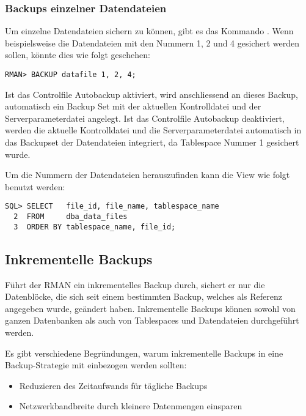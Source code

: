         \subsubsection{Backups einzelner Datendateien}
          Um einzelne Datendateien sichern zu k\"onnen, gibt es das Kommando . Wenn beispielsweise die Datendateien mit den Nummern 1, 2 und 4 gesichert werden sollen, k\"onnte dies wie folgt geschehen:
          \begin{lstlisting}[caption={Backup einzelner Datendateien},label=admin1311,language=rman]
RMAN> BACKUP datafile 1, 2, 4;
          \end{lstlisting}
          \begin{merke}
            Ist das Controlfile Autobackup aktiviert, wird anschliessend an dieses Backup, automatisch ein Backup Set mit der aktuellen Kontrolldatei und der Serverparameterdatei angelegt. Ist das Controlfile Autobackup deaktiviert, werden die aktuelle Kontrolldatei und die Serverparameterdatei automatisch in das Backupset der Datendateien integriert, da Tablespace Nummer 1 gesichert wurde.
          \end{merke}
          Um die Nummern der Datendateien herauszufinden kann die View  wie folgt benutzt werden:
          \begin{lstlisting}[caption={Herausfinden der Datendateinummern},label=admin1312,language=oracle_sql]
SQL> SELECT   file_id, file_name, tablespace_name
  2  FROM     dba_data_files
  3  ORDER BY tablespace_name, file_id;
          \end{lstlisting}
      \subsection{Inkrementelle Backups}
        F\"uhrt der RMAN ein inkrementelles Backup durch, sichert er nur die Datenbl\"ocke, die sich seit einem bestimmten Backup, welches als Referenz angegeben wurde, ge\"andert haben. Inkrementelle Backups k\"onnen sowohl von ganzen Datenbanken als auch von Tablespaces und Datendateien durchgef\"uhrt werden.

        Es gibt verschiedene Begr\"undungen, warum inkrementelle Backups in eine Backup-Stra\-te\-gie mit einbezogen werden sollten:
        \begin{itemize}
          \item Reduzieren des Zeitaufwands f\"ur t\"agliche Backups
          \item Netzwerkbandbreite durch kleinere Datenmengen einsparen
        \end{itemize}
